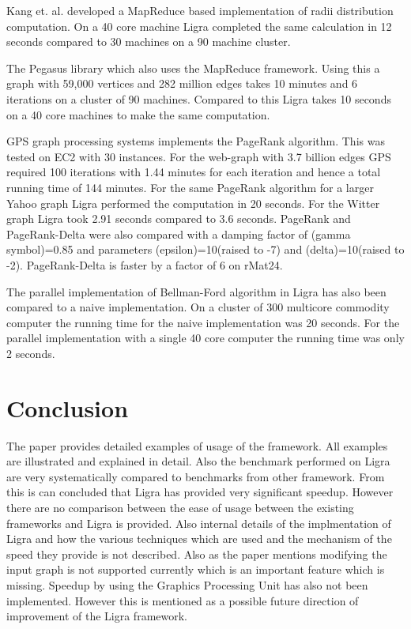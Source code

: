\documentclass[a4paper,10pt,twoside]{article}
\begin{document}
Kang et. al. developed a MapReduce based implementation of radii distribution computation. On a 40 core machine Ligra completed the same calculation in 12 seconds compared to 30 machines on a 90 machine cluster.


The Pegasus library which also uses the MapReduce framework. Using this a graph with 59,000 vertices and 282 million edges takes 10 minutes and 6 iterations on a cluster of 90 machines. Compared to this Ligra takes 10 seconds on a 40 core machines to make the same computation.

GPS graph processing systems implements the PageRank algorithm. This was tested on EC2 with 30 instances. For the web-graph with 3.7 billion edges GPS required 100 iterations with 1.44 minutes for each iteration and hence a total running time of 144 minutes. For the same PageRank algorithm for a larger Yahoo graph Ligra performed the computation in 20 seconds. For the Witter graph Ligra took 2.91 seconds compared to 3.6 seconds. PageRank and PageRank-Delta were also compared with a damping factor of (gamma symbol)=0.85 and parameters (epsilon)=10(raised to -7) and (delta)=10(raised to -2). PageRank-Delta is faster by a factor of 6 on rMat24.

The parallel implementation of Bellman-Ford algorithm in Ligra has also been compared to a naive implementation. On a cluster of 300 multicore commodity computer the running time for the naive implementation was 20 seconds. For the parallel implementation with a single 40 core computer the running time was only 2 seconds.


\section{Conclusion}

The paper provides detailed examples of usage of the framework. All examples are illustrated and explained in detail. Also the benchmark performed on Ligra are very systematically compared to benchmarks from other framework. From this is can concluded that Ligra has provided very significant speedup. However there are no comparison between the ease of usage between the existing frameworks and Ligra is provided. Also internal details of the implmentation of Ligra and how the various techniques which are used and the mechanism of the speed they provide is not described. Also as the paper mentions modifying the input graph is not supported currently which is an important feature which is missing. Speedup by using the Graphics Processing Unit has also not been implemented. However this is mentioned as a possible future direction of improvement of the Ligra framework.


 
\end{document}
